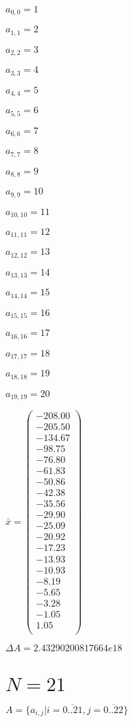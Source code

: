 \documentclass[a4paper,12pt]{article}
\begin{document}
$a _{ 0, 0 } = 1$

$a _{ 1, 1 } = 2$

$a _{ 2, 2 } = 3$

$a _{ 3, 3 } = 4$

$a _{ 4, 4 } = 5$

$a _{ 5, 5 } = 6$

$a _{ 6, 6 } = 7$

$a _{ 7, 7 } = 8$

$a _{ 8, 8 } = 9$

$a _{ 9, 9 } = 10$

$a _{ 10, 10 } = 11$

$a _{ 11, 11 } = 12$

$a _{ 12, 12 } = 13$

$a _{ 13, 13 } = 14$

$a _{ 14, 14 } = 15$

$a _{ 15, 15 } = 16$

$a _{ 16, 16 } = 17$

$a _{ 17, 17 } = 18$

$a _{ 18, 18 } = 19$

$a _{ 19, 19 } = 20$

$\bar { x } = \begin{pmatrix}
-208.00 \\
-205.50 \\
-134.67 \\
-98.75 \\
-76.80 \\
-61.83 \\
-50.86 \\
-42.38 \\
-35.56 \\
-29.90 \\
-25.09 \\
-20.92 \\
-17.23 \\
-13.93 \\
-10.93 \\
-8.19 \\
-5.65 \\
-3.28 \\
-1.05 \\
1.05 \\
\end{pmatrix}
$

$\Delta A = 2.43290200817664e18$



\section{ $N = 21$ }
$A = \{ a _{ i, j } | i = \overline { 0..21 }, j = \overline { 0..22 } \}$
\end{document}
